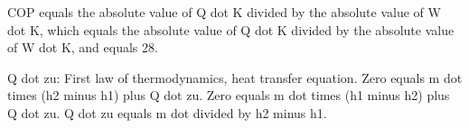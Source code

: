 COP equals the absolute value of Q dot K divided by the absolute value of W dot K, which equals the absolute value of Q dot K divided by the absolute value of W dot K, and equals 28.

Q dot zu: First law of thermodynamics, heat transfer equation.  
Zero equals m dot times (h2 minus h1) plus Q dot zu.  
Zero equals m dot times (h1 minus h2) plus Q dot zu.  
Q dot zu equals m dot divided by h2 minus h1.